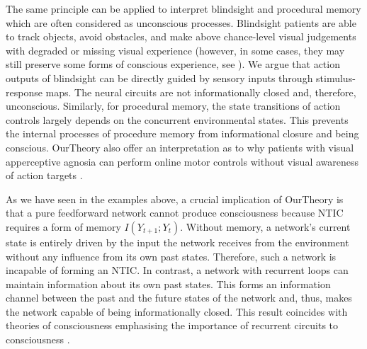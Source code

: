 \documentclass[utf8]{article}
\begin{document}
        		The same principle can be applied to interpret blindsight \citep{humphrey1999history, humphrey1974vision, Humphrey1970} and procedural memory \citep{doyon2009contributions, ashby2010cortical} which are often considered as unconscious processes.
        		Blindsight patients are able to track objects, avoid obstacles, and make above chance-level visual judgements with degraded or missing visual experience (however, in some cases, they may still preserve some forms of conscious experience, see \cite{overgaard2011visual, mazzi2016blind}). We argue that action outputs of blindsight can be directly guided by sensory inputs through stimulus-response maps. The neural circuits are not informationally closed and, therefore, unconscious. Similarly, for procedural memory, the state transitions of action controls largely depends on the concurrent environmental states. This prevents the internal processes of procedure memory from informational closure and being conscious. \ac{OurTheory} also offer an interpretation as to why patients with visual apperceptive agnosia \citep{james2003ventral} can perform online motor controls without visual awareness of action targets \citep{10.3389/fneur.2014.00255}. 

        		As we have seen in the examples above, a crucial implication of \ac{OurTheory} is that a pure feedforward network cannot produce consciousness because NTIC requires a form of memory $I(Y_{t+1};Y_{t})$. Without memory, a network's current state is entirely driven by the input the network receives from the environment without any influence from its own past states. Therefore, such a network is incapable of forming an NTIC. In contrast, a network with recurrent loops can maintain information about its own past states. This forms an information channel between the past and the future states of the network and, thus, makes the network capable of being informationally closed. This result coincides with theories of consciousness emphasising the importance of recurrent circuits to consciousness \citep{lamme2006towards, edelman1992bright, tononi2008neural}.
\end{document}
